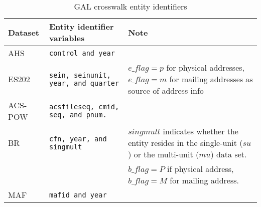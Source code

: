 \begin{table}[htbp]
  \centering
  \caption{GAL crosswalk entity identifiers}
  \label{tab:gal:xwalks}
  \begin{tabular}{lp{3in}p{2in}}
Dataset & Entity identifier variables & Note \\
\hline
\hline
AHS     &\tt \footnotesize control and year \\
ES202   &\tt \footnotesize sein, seinunit, year, and quarter & $e\_flag = p$ for physical
                                             addresses, $e\_flag = m$ for mailing addresses 
                                             as source of address info\\
ACS-POW &\tt  \footnotesize acsfileseq, cmid, seq, and pnum. \\
BR      &\tt  \footnotesize cfn, year, and singmult & $singmult$ indicates
                                     whether the entity resides in the single-unit ($su$) or the multi-unit
                                     ($mu$) data set.\\
        &\tt                          & $b\_flag =P$ if  physical address,
                                     $b\_flag=M $ for mailing address.\\
MAF     &\tt  \footnotesize mafid and year \\
\hline
  \end{tabular}
\end{table}


